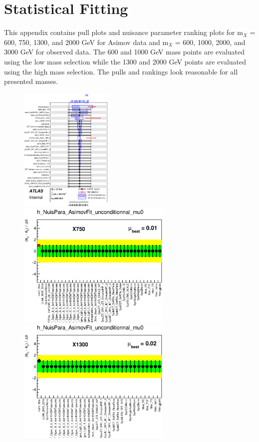 
\section{Statistical Fitting}
\label{app:StatFit}

This appendix contains pull plots and nuisance parameter ranking plots for m$_X$ = 600, 750, 1300, and 2000 GeV for Asimov data and m$_X$ = 600, 1000, 2000, and 3000 GeV for observed data. The 600 and 1000 GeV mass points are evaluated using the low mass selection while the 1300 and 2000 GeV points are evaluated using the high mass selection. The pulls and rankings look reasonable for all presented masses.

\begin{figure}[hb]
\begin{center}
  \includegraphics[height=60mm]{figures/statFit_appendix/pullPlot_X600_mu0_unconditional.eps} 
  \includegraphics[height=60mm]{figures/statFit_appendix/pullPlot_X750_mu0_unconditional.eps}
  \includegraphics[height=60mm]{figures/statFit_appendix/pullPlot_X1300_mu0_unconditional.eps}

\end{center}
\end{figure}
